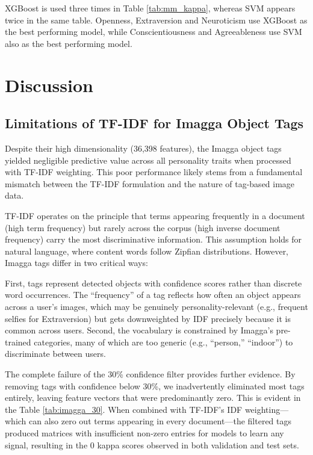 XGBoost is used three times in Table \ref{tab:mm_kappa}, whereas SVM appears twice in the same table. Openness, Extraversion and Neuroticism use XGBoost as the best performing model, while Conscientiousness and Agreeableness use SVM also as the best performing model.

\section{Discussion}

\subsection{Limitations of TF-IDF for Imagga Object Tags}

Despite their high dimensionality (36,398 features), the Imagga object tags yielded negligible predictive value across all personality traits when processed with TF-IDF weighting. This poor performance likely stems from a fundamental mismatch between the TF-IDF formulation and the nature of tag-based image data.

TF-IDF operates on the principle that terms appearing frequently in a document (high term frequency) but rarely across the corpus (high inverse document frequency) carry the most discriminative information. This assumption holds for natural language, where content words follow Zipfian distributions. However, Imagga tags differ in two critical ways:

First, tags represent detected objects with confidence scores rather than discrete word occurrences. The ``frequency'' of a tag reflects how often an object appears across a user's images, which may be genuinely personality-relevant (e.g., frequent selfies for Extraversion) but gets downweighted by IDF precisely because it is common across users. Second, the vocabulary is constrained by Imagga's pre-trained categories, many of which are too generic (e.g., ``person,'' ``indoor'') to discriminate between users.

The complete failure of the 30\% confidence filter provides further evidence. By removing tags with confidence below 30\%, we inadvertently eliminated most tags entirely, leaving feature vectors that were predominantly zero. This is evident in the Table \ref{tab:imagga_30}. When combined with TF-IDF's IDF weighting---which can also zero out terms appearing in every document---the filtered tags produced matrices with insufficient non-zero entries for models to learn any signal, resulting in the 0 kappa scores observed in both validation and test sets.

